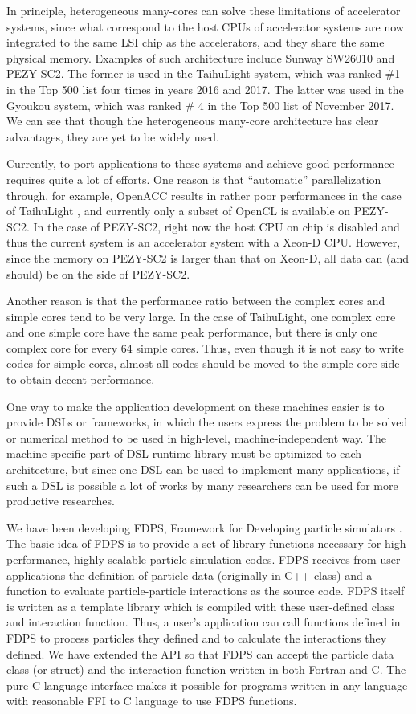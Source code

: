 \documentclass[Afour,sageh,times]{sagej}
\begin{document}
In principle, heterogeneous many-cores can solve these limitations of
accelerator systems, since what correspond to the host CPUs of
accelerator systems are now integrated to the same LSI chip as the
accelerators, and they share the same physical memory.  Examples of
such architecture include Sunway SW26010 and PEZY-SC2.  The former is
used in the TaihuLight system, which was ranked \#1 in the Top 500
list four times in years 2016 and 2017. The latter was used in the
Gyoukou system, which was ranked \# 4 in the Top 500 list of November
2017. We can see that though the heterogeneous many-core architecture
has clear advantages, they are yet to be widely used.

Currently, to port applications to these systems and achieve good
performance requires quite a lot of efforts. One reason is that
``automatic'' parallelization through, for example, OpenACC results in
rather poor performances in the case of TaihuLight \citep{cai2018},
and currently only a subset of OpenCL is available on PEZY-SC2. In the
case of PEZY-SC2, right now the host CPU on chip is disabled and thus
the current system is an accelerator system with a Xeon-D
CPU. However, since the memory on PEZY-SC2 is larger than that on
Xeon-D, all data can (and should) be on the side of PEZY-SC2.

Another reason is that the performance ratio between the complex cores
and simple cores tend to be very large. In the case of TaihuLight, one
complex core and one simple core have the same peak performance, but
there is only one complex core for every 64 simple cores. Thus, even
though it is not easy to write codes for simple cores, almost all
codes should be moved to the simple core side to obtain decent
performance.

One way to make the application development on these machines easier
is to provide DSLs or frameworks, in which the users express the
problem to be solved or numerical method to be used in high-level,
machine-independent way. The machine-specific part of DSL runtime
library must be optimized to each architecture, but since one DSL can
be used to implement many applications, if such a DSL is possible a
lot of works by many researchers can be used for more productive
researches.

We have been developing FDPS, Framework for Developing particle
simulators \citep{Iwasawaetal2016}.  The basic idea of FDPS is to
provide a set of library functions necessary for high-performance,
highly scalable particle simulation codes. FDPS receives from user
applications the definition of particle data (originally in C++ class)
and a function to evaluate particle-particle interactions as the
source code. FDPS itself is written as a template library which is
compiled with these user-defined class and interaction function. Thus,
a user's application can call functions defined in FDPS to process
particles they defined and to calculate the interactions they
defined. We have extended the API so that FDPS can accept the particle
data class (or struct) and the interaction function written in both
Fortran \citep{2018PASJ...70...70N} and C. The pure-C language
interface makes it possible for programs written in any language with
reasonable FFI to C language to use FDPS functions.
\end{document}
